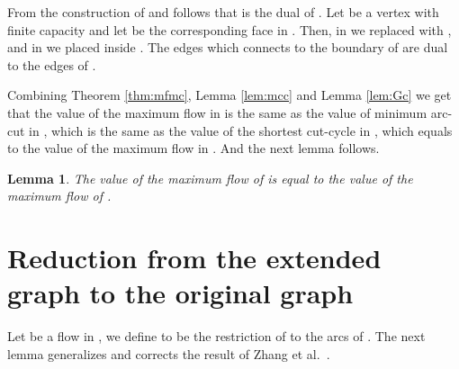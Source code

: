 \documentclass[a4paper,11pt]{article}
\newtheorem{lemma}[theorem]{Lemma}
\begin{document}
From the construction of  and  follows that  is the
dual of . Let  be a vertex with finite capacity and let 
be the corresponding face in . Then, in  we replaced 
with , and in  we placed  inside . The edges which
connects  to the boundary of  are dual to the edges of .

Combining Theorem \ref{thm:mfmc}, Lemma \ref{lem:mcc}
and Lemma \ref{lem:Gc} we get that the value of the maximum flow in
 is the same as the value of minimum arc-cut in , which is
the same as the value of the shortest cut-cycle in , which equals
to the value of the maximum flow in . And the next lemma follows.
\begin{lemma} \label{lem:Ge}
    The value of the maximum flow of  is equal to the value of the maximum flow of .
\end{lemma}

\section{Reduction from the extended graph to the original graph}
\label{sec:acy}
Let  be a flow in ,
we define 
to be the restriction of  to the arcs of .
 The next
lemma generalizes and corrects the result of Zhang et
al.~\cite[Theorem 3]{ZLC08}.
\end{document}
